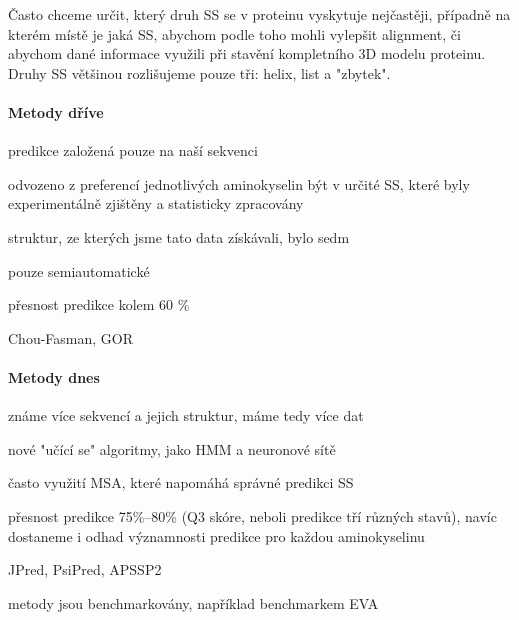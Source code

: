 \documentclass[DIV=8]{scrreprt}
\begin{document}
Často chceme určit, který druh SS se v proteinu vyskytuje nejčastěji, případně na kterém místě je jaká SS, abychom podle toho mohli vylepšit alignment, či abychom dané informace využili při stavění kompletního 3D modelu proteinu. Druhy SS většinou rozlišujeme pouze tři: helix, list a "zbytek".

\paragraph{Metody dříve}
\begin{myItemize}[nosep]
    \item predikce založená pouze na naší sekvenci
    \item odvozeno z preferencí jednotlivých aminokyselin být v určité SS, které byly experimentálně zjištěny a statisticky zpracovány
\begin{myItemize}[nosep]
    \item struktur, ze kterých jsme tato data získávali, bylo sedm
\end{myItemize}

    \item pouze semiautomatické
    \item přesnost predikce kolem 60 \%
    \item Chou-Fasman, GOR
\end{myItemize}



\paragraph{Metody dnes}
\begin{myItemize}[nosep]
    \item známe více sekvencí a jejich struktur, máme tedy více dat
    \item nové "učící se" algoritmy, jako HMM a neuronové sítě
\begin{myItemize}[nosep]
    \item často využití MSA, které napomáhá správné predikci SS
\end{myItemize}

    \item přesnost predikce 75\%--80\% (Q3 skóre, neboli predikce tří různých stavů), navíc dostaneme i odhad významnosti predikce pro každou aminokyselinu
    \item JPred, PsiPred, APSSP2
    \item metody jsou benchmarkovány, například benchmarkem EVA
\end{myItemize}
\end{document}
